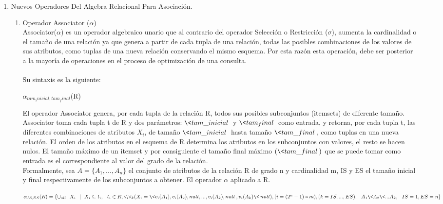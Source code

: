 \begin{enumerate}
\item Nuevos Operadores Del Algebra Relacional Para Asociaci\'on.
\begin{enumerate}
\item Operador Associator ($\alpha$)\\
Associator($\alpha$) es un operador algebraico unario que al contrario del operador Selecci\'on o 
Restricci\'on ($\sigma$), aumenta la cardinalidad o el tama\~no de una relaci\'on ya que genera a partir de cada
tupla de una relaci\'on, todas las posibles combinaciones de los valores de sus atributos, como tuplas de una
nueva relaci\'on conservando el mismo esquema. Por esta raz\'on esta operaci\'on, debe ser posterior a la 
mayor\'ia de operaciones en el proceso de optimizaci\'on de una consulta.\\ \\
Su sintaxis es la siguiente:\\
\begin{center}$\alpha_{tam_inicial, tam_final}$(R)\end{center}
El operador Associator genera, por cada tupla de la relaci\'on R, todos sus posibles subconjuntos (itemsets)
de diferente tama\~no. Associator toma cada tupla t de R y dos par\'ametros: $\<tam\_inicial\>$ y 
$\<tam_final\>$ como entrada, y retorna, por cada tupla t, las diferentes combinaciones de atributos
$X_{i}$, de tama\~no $\<tam\_inicial\>$ hasta tama\~no $\<tam\_final\>$, como tuplas en una nueva
relaci\'on. El orden de los atributos en el esquema de R determina los atributos en los subconjuntos con valores,
el resto se hacen nulos. El tama\~no m\'aximo de un itemset y por consiguiente el tama\~no final m\'aximo
$(\<tam\_final\>)$ que se puede tomar como entrada es el correspondiente al valor del grado de la relaci\'on.\\
Formalmente, sea $A=\{A_{1},...,A_{n}\}$ el conjunto de atributos de la relaci\'on R de grado n y cardinalidad m,
IS y ES el tama\~no inicial y final respectivamente de los subconjuntos a obtener. El operador $\alpha$ aplicado
a  R.

\begin{center}
$\alpha_{IS,ES}(R)=\{ \cup_{all}\ \ X_{i}\ \ |\ \ X_{i} \subseteq t_{i},\ \ t_{i} \in R, \forall_{i}
\forall_{k}(X_{i}=
\< v_{i}(A_{1}),v_{i}(A_{2}),null,...,v_{i}(A_{k}),null\>,v_{i}(A_{k})\< \> null),(i=(2^{n}-1)*m), (k=IS,...,ES),
\ \ A_{1}\< A_{2}\< ...A_{k},\ \ IS=1,ES=n\}$
\end{center}


\end{enumerate}
\end{enumerate}
